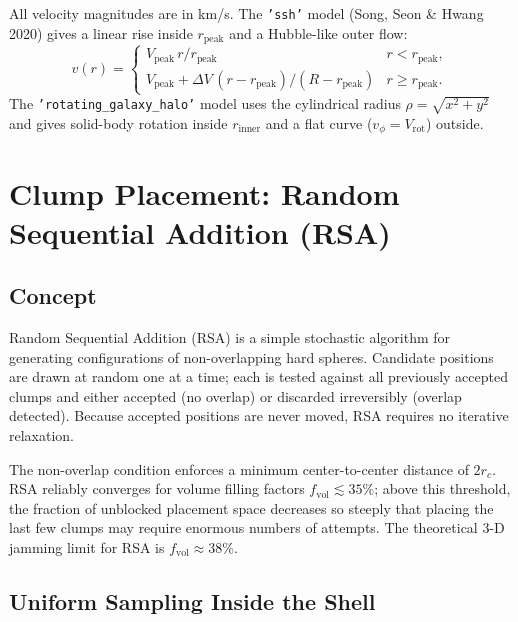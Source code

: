 \documentclass[english,a4paper]{my_memo}
\begin{document}
All velocity magnitudes are in km/s.  The \texttt{'ssh'} model (Song, Seon \&
Hwang 2020) gives a linear rise inside $r_\mathrm{peak}$ and a Hubble-like
outer flow:
\begin{equation}
  v(r) = \begin{cases}
    V_\mathrm{peak}\,r / r_\mathrm{peak} & r < r_\mathrm{peak}, \\
    V_\mathrm{peak} + \Delta V\,(r - r_\mathrm{peak})/(R - r_\mathrm{peak}) & r \ge r_\mathrm{peak}.
  \end{cases}
\end{equation}
The \texttt{'rotating\_galaxy\_halo'} model uses the cylindrical radius
$\rho = \sqrt{x^2+y^2}$ and gives solid-body rotation inside $r_\mathrm{inner}$
and a flat curve ($v_\phi = V_\mathrm{rot}$) outside.

\section{Clump Placement: Random Sequential Addition (RSA)}

\subsection{Concept}

Random Sequential Addition (RSA) is a simple stochastic algorithm for
generating configurations of non-overlapping hard spheres.  Candidate
positions are drawn at random one at a time; each is tested against all
previously accepted clumps and either accepted (no overlap) or discarded
irreversibly (overlap detected).  Because accepted positions are never moved,
RSA requires no iterative relaxation.

The non-overlap condition enforces a minimum center-to-center distance of
$2r_c$.  RSA reliably converges for volume filling factors $f_\mathrm{vol}
\lesssim 35\%$; above this threshold, the fraction of unblocked placement
space decreases so steeply that placing the last few clumps may require
enormous numbers of attempts.  The theoretical 3-D jamming limit for RSA is
$f_\mathrm{vol} \approx 38\%$.

\subsection{Uniform Sampling Inside the Shell}
\label{sec:uniform_shell}
\end{document}
